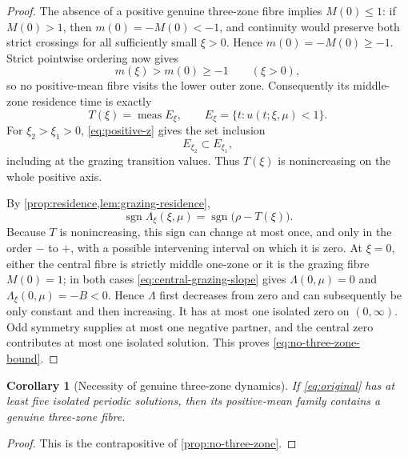 \documentclass[11pt]{article}
\newtheorem{corollary}[theorem]{Corollary}
\begin{document}
\begin{proof}
The absence of a positive genuine three-zone fibre implies \(M(0)\le1\): if
\(M(0)>1\), then \(m(0)=-M(0)<-1\), and continuity would preserve both strict
crossings for all sufficiently small \(\xi>0\).  Hence
\(m(0)=-M(0)\ge-1\).  Strict pointwise ordering now gives
\[
 m(\xi)>m(0)\ge-1\qquad(\xi>0),
\]
so no positive-mean fibre visits the lower outer zone.  Consequently its
middle-zone residence time is exactly
\begin{equation}\label{eq:right-residence-set}
 T(\xi)=\operatorname{meas}E_\xi,\qquad
 E_\xi=\{t:u(t;\xi,\mu)<1\}.
\end{equation}
For \(\xi_2>\xi_1>0\), \eqref{eq:positive-z} gives the set inclusion
\[
 E_{\xi_2}\subset E_{\xi_1},
\]
including at the grazing transition values.  Thus \(T(\xi)\) is nonincreasing
on the whole positive axis.

By \cref{prop:residence,lem:grazing-residence},
\[
 \operatorname{sgn}\Lambda_\xi(\xi,\mu)
 =\operatorname{sgn}\bigl(\rho-T(\xi)\bigr).
\]
Because \(T\) is nonincreasing, this sign can change at most once, and only in
the order \(-\) to \(+\), with a possible intervening interval on which it is
zero.  At \(\xi=0\), either the central fibre is strictly middle one-zone or it
is the grazing fibre \(M(0)=1\); in both cases
\eqref{eq:central-grazing-slope} gives
\(\Lambda(0,\mu)=0\) and \(\Lambda_\xi(0,\mu)=-B<0\).  Hence \(\Lambda\) first
decreases from zero and can subsequently be only constant and then increasing.
It has at most one isolated zero on \((0,\infty)\).  Odd symmetry supplies at
most one negative partner, and the central zero contributes at most one
isolated solution.  This proves \eqref{eq:no-three-zone-bound}.
\end{proof}

\begin{corollary}[Necessity of genuine three-zone dynamics]\label{cor:three-zone-necessary}
If \eqref{eq:original} has at least five isolated periodic solutions, then its
positive-mean family contains a genuine three-zone fibre.
\end{corollary}

\begin{proof}
This is the contrapositive of \cref{prop:no-three-zone}.
\end{proof}
\end{document}
